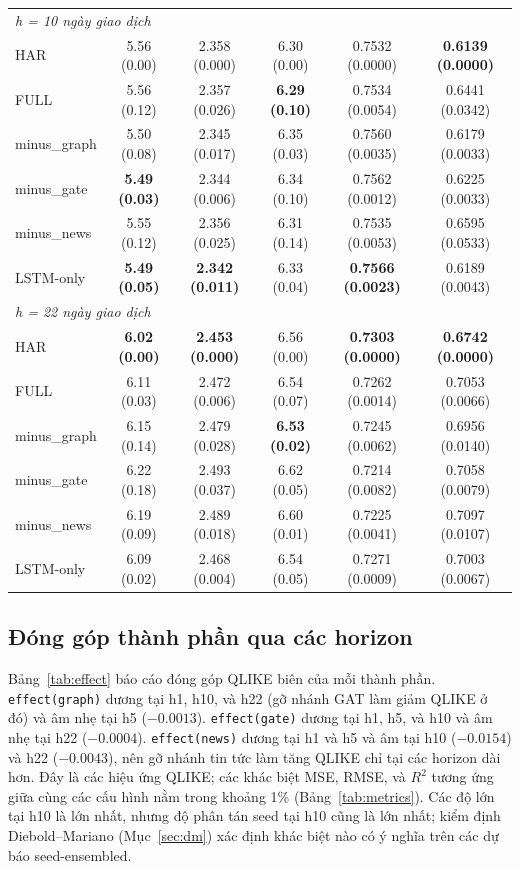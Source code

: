 \documentclass[runningheads]{llncs}
\begin{document}
\begin{table}[t]
\begin{tabular}{lccccc}
\midrule
\multicolumn{6}{l}{\textit{h = 10 ngày giao dịch}}\\
HAR         & 5.56 (0.00) & 2.358 (0.000) & 6.30 (0.00) & 0.7532 (0.0000) & \textbf{0.6139 (0.0000)} \\
FULL        & 5.56 (0.12) & 2.357 (0.026) & \textbf{6.29 (0.10)} & 0.7534 (0.0054) & 0.6441 (0.0342) \\
minus\_graph & 5.50 (0.08) & 2.345 (0.017) & 6.35 (0.03) & 0.7560 (0.0035) & 0.6179 (0.0033) \\
minus\_gate  & \textbf{5.49 (0.03)} & 2.344 (0.006) & 6.34 (0.10) & 0.7562 (0.0012) & 0.6225 (0.0033) \\
minus\_news  & 5.55 (0.12) & 2.356 (0.025) & 6.31 (0.14) & 0.7535 (0.0053) & 0.6595 (0.0533) \\
LSTM-only   & \textbf{5.49 (0.05)} & \textbf{2.342 (0.011)} & 6.33 (0.04) & \textbf{0.7566 (0.0023)} & 0.6189 (0.0043) \\
\midrule
\multicolumn{6}{l}{\textit{h = 22 ngày giao dịch}}\\
HAR         & \textbf{6.02 (0.00)} & \textbf{2.453 (0.000)} & 6.56 (0.00) & \textbf{0.7303 (0.0000)} & \textbf{0.6742 (0.0000)} \\
FULL        & 6.11 (0.03) & 2.472 (0.006) & 6.54 (0.07) & 0.7262 (0.0014) & 0.7053 (0.0066) \\
minus\_graph & 6.15 (0.14) & 2.479 (0.028) & \textbf{6.53 (0.02)} & 0.7245 (0.0062) & 0.6956 (0.0140) \\
minus\_gate  & 6.22 (0.18) & 2.493 (0.037) & 6.62 (0.05) & 0.7214 (0.0082) & 0.7058 (0.0079) \\
minus\_news  & 6.19 (0.09) & 2.489 (0.018) & 6.60 (0.01) & 0.7225 (0.0041) & 0.7097 (0.0107) \\
LSTM-only   & 6.09 (0.02) & 2.468 (0.004) & 6.54 (0.05) & 0.7271 (0.0009) & 0.7003 (0.0067) \\
\bottomrule
\end{tabular}
\end{table}

\subsection{Đóng góp thành phần qua các horizon}
\label{sec:components}
Bảng~\ref{tab:effect} báo cáo đóng góp QLIKE biên của mỗi thành phần. \texttt{effect(graph)} dương tại
h1, h10, và h22 (gỡ nhánh GAT làm giảm QLIKE ở đó) và âm nhẹ tại h5 ($-0.0013$). \texttt{effect(gate)}
dương tại h1, h5, và h10 và âm nhẹ tại h22 ($-0.0004$). \texttt{effect(news)} dương tại h1 và h5 và âm
tại h10 ($-0.0154$) và h22 ($-0.0043$), nên gỡ nhánh tin tức làm tăng QLIKE chỉ tại các horizon dài hơn.
Đây là các hiệu ứng QLIKE; các khác biệt MSE, RMSE, và $R^2$ tương ứng giữa cùng các cấu hình nằm trong
khoảng 1\% (Bảng~\ref{tab:metrics}). Các độ lớn tại h10 là lớn nhất, nhưng độ phân tán seed tại h10 cũng
là lớn nhất; kiểm định Diebold--Mariano (Mục~\ref{sec:dm}) xác định khác biệt nào có ý nghĩa trên các dự
báo seed-ensembled.
\end{document}
